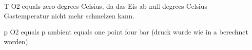 T O2 equals zero degrees Celsius, da das Eis ab null degrees Celsius Gastemperatur nicht mehr schmelzen kann.

p O2 equals p ambient equals one point four bar (druck wurde wie in a berechnet worden).